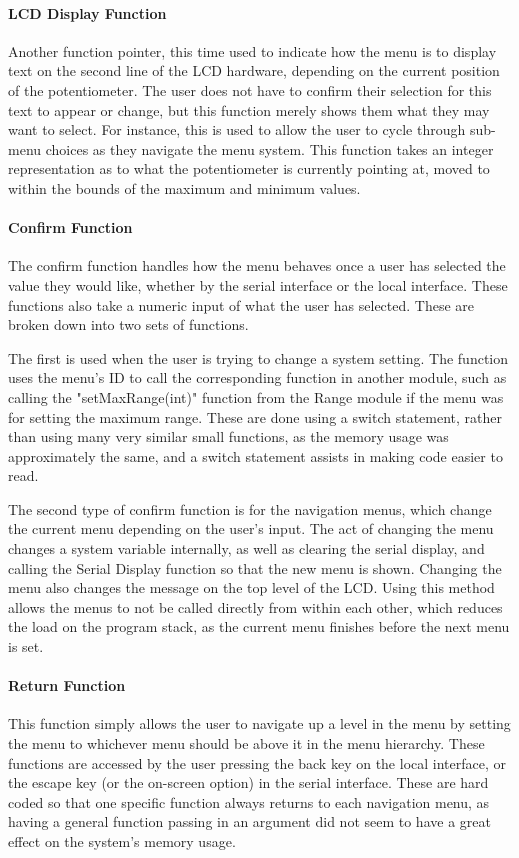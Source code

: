 \documentclass[]{report}
\begin{document}
\paragraph{LCD Display Function}
Another function pointer, this time used to indicate how the menu is to display text on the second line of the LCD hardware, depending on the current position of the potentiometer. The user does not have to confirm their selection for this text to appear or change, but this function merely shows them what they may want to select. For instance, this is used to allow the user to cycle through sub-menu choices as they navigate the menu system. This function takes an integer representation as to what the potentiometer is currently pointing at, moved to within the bounds of the maximum and minimum values. 

\paragraph{Confirm Function}
The confirm function handles how the menu behaves once a user has selected the value they would like, whether by the serial interface or the local interface. These functions also take a numeric input of what the user has selected. These are broken down into two sets of functions. 

The first is used when the user is trying to change a system setting. The function uses the menu's ID to call the corresponding function in another module, such as calling the "setMaxRange(int)" function from the Range module if the menu was for setting the maximum range. These are done using a switch statement, rather than using many very similar small functions, as the memory usage was approximately the same, and a switch statement assists in making code easier to read.   

The second type of confirm function is for the navigation menus, which change the current menu depending on the user's input. The act of changing the menu changes a system variable internally, as well as clearing the serial display, and calling the Serial Display function so that the new menu is shown. Changing the menu also changes the message on the top level of the LCD. Using this method allows the menus to not be called directly from within each other, which reduces the load on the program stack, as the current menu finishes before the next menu is set.

\paragraph{Return Function}
This function simply allows the user to navigate up a level in the menu by setting the menu to whichever menu should be above it in the menu hierarchy. These functions are accessed by the user pressing the back key on the local interface, or the escape key (or the on-screen option) in the serial interface. These are hard coded so that one specific function always returns to each navigation menu, as having a general function passing in an argument did not seem to have a great effect on the system's memory usage. 
\end{document}
